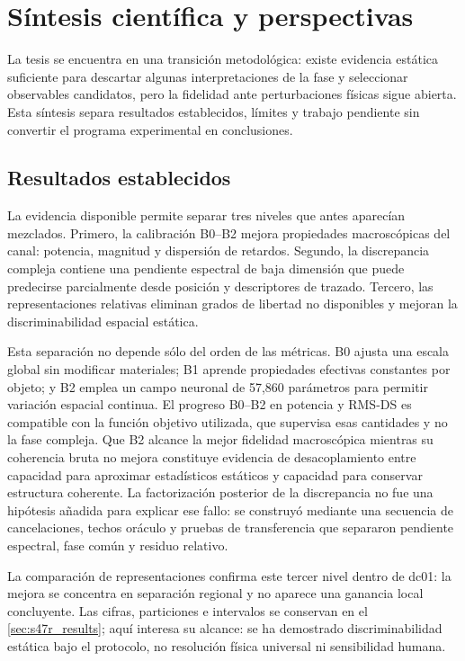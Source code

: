 \chapter{Síntesis científica y perspectivas}
\label{ch:conclusions}

La tesis se encuentra en una transición metodológica: existe evidencia estática
suficiente para descartar algunas interpretaciones de la fase y seleccionar
observables candidatos, pero la fidelidad ante perturbaciones físicas sigue abierta.
Esta síntesis separa resultados establecidos, límites y trabajo pendiente sin
convertir el programa experimental en conclusiones.

\section{Resultados establecidos}

La evidencia disponible permite separar tres niveles que antes aparecían mezclados. Primero, la calibración B0--B2 mejora propiedades macroscópicas del canal: potencia, magnitud y dispersión de retardos. Segundo, la discrepancia compleja contiene una pendiente espectral de baja dimensión que puede predecirse parcialmente desde posición y descriptores de trazado. Tercero, las representaciones relativas eliminan grados de libertad no disponibles y mejoran la discriminabilidad espacial estática.

Esta separación no depende sólo del orden de las métricas. B0 ajusta una escala
global sin modificar materiales; B1 aprende propiedades efectivas constantes por
objeto; y B2 emplea un campo neuronal de 57,860 parámetros para permitir variación
espacial continua. El progreso B0--B2 en potencia y RMS-DS es compatible con la
función objetivo utilizada, que supervisa esas cantidades y no la fase compleja.
Que B2 alcance la mejor fidelidad macroscópica mientras su coherencia bruta no
mejora constituye evidencia de desacoplamiento entre capacidad para aproximar
estadísticos estáticos y capacidad para conservar estructura coherente. La
factorización posterior de la discrepancia no fue una hipótesis añadida para
explicar ese fallo: se construyó mediante una secuencia de cancelaciones, techos
oráculo y pruebas de transferencia que separaron pendiente espectral, fase común
y residuo relativo.

La comparación de representaciones confirma este tercer nivel dentro de dc01: la
mejora se concentra en separación regional y no aparece una ganancia local
concluyente. Las cifras, particiones e intervalos se conservan en el
\cref{sec:s47r_results}; aquí interesa su alcance: se ha demostrado discriminabilidad
estática bajo el protocolo, no resolución física universal ni sensibilidad humana.

